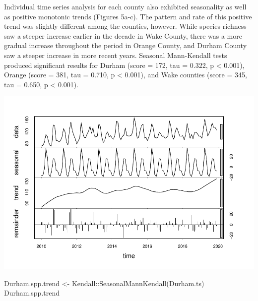 \documentclass[
  12pt,
]{article}
\newenvironment{Shaded}{\begin{snugshade}}{\end{snugshade}}
\newcommand{\AttributeTok}[1]{\textcolor[rgb]{0.77,0.63,0.00}{#1}}
\newcommand{\CommentTok}[1]{\textcolor[rgb]{0.56,0.35,0.01}{\textit{#1}}}
\newcommand{\DecValTok}[1]{\textcolor[rgb]{0.00,0.00,0.81}{#1}}
\newcommand{\FunctionTok}[1]{\textcolor[rgb]{0.00,0.00,0.00}{#1}}
\newcommand{\NormalTok}[1]{#1}
\newcommand{\OtherTok}[1]{\textcolor[rgb]{0.56,0.35,0.01}{#1}}
\newcommand{\SpecialCharTok}[1]{\textcolor[rgb]{0.00,0.00,0.00}{#1}}
\newcommand{\StringTok}[1]{\textcolor[rgb]{0.31,0.60,0.02}{#1}}
\begin{document}
Individual time series analysis for each county also exhibited
seasonality as well as positive monotonic trends (Figures 5a-c). The
pattern and rate of this positive trend was slightly different among the
counties, however. While species richness saw a steeper increase earlier
in the decade in Wake County, there was a more gradual increase
throughout the period in Orange County, and Durham County saw a steeper
increase in more recent years. Seasonal Mann-Kendall tests produced
significant results for Durham (score = 172, tau = 0.322, p \textless{}
0.001), Orange (score = 381, tau = 0.710, p \textless{} 0.001), and Wake
counties (score = 345, tau = 0.650, p \textless{} 0.001).

\begin{Shaded}
\end{Shaded}

\includegraphics{Project_Template_files/figure-latex/county SPP TS-1.pdf}

\begin{Shaded}
\begin{Highlighting}[]
\NormalTok{Durham.spp.trend }\OtherTok{\textless{}{-}}\NormalTok{ Kendall}\SpecialCharTok{::}\FunctionTok{SeasonalMannKendall}\NormalTok{(Durham.ts) }
\NormalTok{Durham.spp.trend}
\end{Highlighting}
\end{Shaded}
\end{document}
